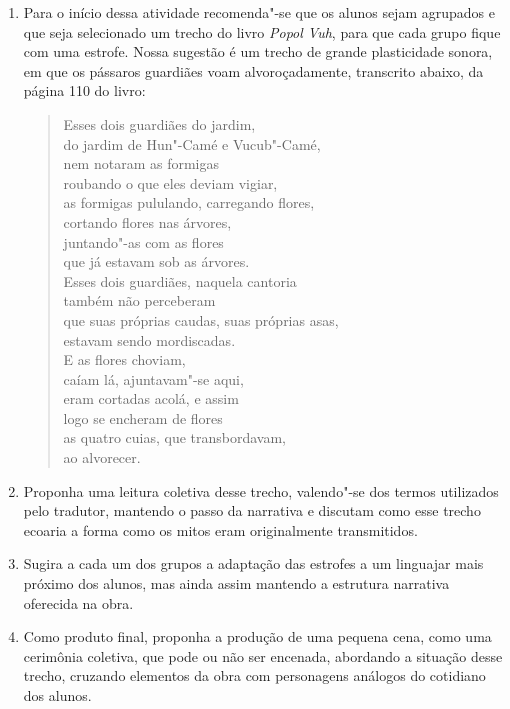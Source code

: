 \documentclass[12pt]{extarticle}
\begin{document}
\begin{enumerate}
\item
Para o início dessa atividade recomenda"-se que os alunos sejam agrupados e que
seja selecionado um trecho do livro \emph{Popol Vuh}, para que cada grupo fique 
com uma estrofe. Nossa sugestão é um trecho de grande plasticidade sonora, em que 
os pássaros guardiães voam alvoroçadamente, transcrito abaixo, da página 110 do livro:

\begin{verse}
Esses dois guardiães do jardim,\\
do jardim de Hun"-Camé e Vucub"-Camé,\\
nem notaram as formigas\\
roubando o que eles deviam vigiar,\\
as formigas pululando, carregando flores,\\
cortando flores nas árvores,\\
juntando"-as com as flores\\
que já estavam sob as árvores.\\


Esses dois guardiães, naquela cantoria\\
também não perceberam\\
que suas próprias caudas, suas próprias asas,\\
estavam sendo mordiscadas.\\


E as flores choviam,\\
caíam lá, ajuntavam"-se aqui,\\
eram cortadas acolá, e assim\\
logo se encheram de flores\\
as quatro cuias, que transbordavam,\\
ao alvorecer.
\end{verse}

\item
Proponha uma leitura coletiva desse trecho, valendo"-se dos termos utilizados pelo 
tradutor, mantendo o passo da narrativa e discutam como esse trecho ecoaria a forma como 
os mitos eram originalmente transmitidos.

\item
Sugira a cada um dos grupos a adaptação das estrofes a um linguajar mais próximo dos alunos, mas
ainda assim mantendo a estrutura narrativa oferecida na obra.

\item
Como produto final, proponha a produção de uma pequena cena, como uma cerimônia coletiva, 
que pode ou não ser encenada, abordando a situação desse trecho, cruzando 
elementos da obra com personagens análogos do cotidiano dos alunos.

\end{enumerate}
\end{document}
